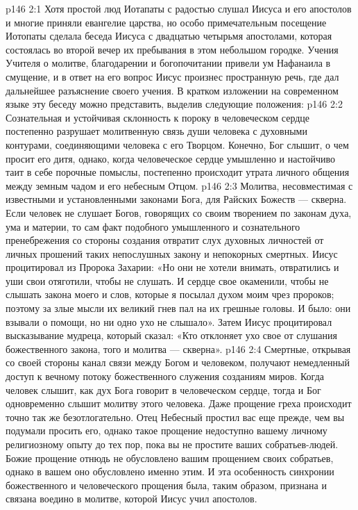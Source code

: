 \vs p146 2:1 Хотя простой люд Иотапаты с радостью слушал Иисуса и его апостолов и многие приняли евангелие царства, но особо примечательным посещение Иотопаты сделала беседа Иисуса с двадцатью четырьмя апостолами, которая состоялась во второй вечер их пребывания в этом небольшом городке. Учения Учителя о молитве, благодарении и богопочитании привели ум Нафанаила в смущение, и в ответ на его вопрос Иисус произнес пространную речь, где дал дальнейшее разъяснение своего учения. В кратком изложении на современном языке эту беседу можно представить, выделив следующие положения:
\vs p146 2:2 \pc {}\bibnobreakspace Сознательная и устойчивая склонность к пороку в человеческом сердце постепенно разрушает молитвенную связь души человека с духовными контурами, соединяющими человека с его Творцом. Конечно, Бог слышит, о чем просит его дитя, однако, когда человеческое сердце умышленно и настойчиво таит в себе порочные помыслы, постепенно происходит утрата личного общения между земным чадом и его небесным Отцом.
\vs p146 2:3 \pc {}\bibnobreakspace Молитва, несовместимая с известными и установленными законами Бога, для Райских Божеств --- скверна. Если человек не слушает Богов, говорящих со своим творением по законам духа, ума и материи, то сам факт подобного умышленного и сознательного пренебрежения со стороны создания отвратит слух духовных личностей от личных прошений таких непослушных закону и непокорных смертных. Иисус процитировал из Пророка Захарии: «Но они не хотели внимать, отвратились и уши свои отяготили, чтобы не слушать. И сердце свое окаменили, чтобы не слышать закона моего и слов, которые я посылал духом моим чрез пророков; поэтому за злые мысли их великий гнев пал на их грешные головы. И было: они взывали о помощи, но ни одно ухо не слышало». Затем Иисус процитировал высказывание мудреца, который сказал: «Кто отклоняет ухо свое от слушания божественного закона, того и молитва --- скверна».
\vs p146 2:4 \pc {}\bibnobreakspace Смертные, открывая со своей стороны канал связи между Богом и человеком, получают немедленный доступ к вечному потоку божественного служения созданиям миров. Когда человек слышит, как дух Бога говорит в человеческом сердце, тогда и Бог одновременно слышит молитву этого человека. Даже прощение греха происходит точно так же безотлогательно. Отец Небесный простил вас еще прежде, чем вы подумали просить его, однако такое прощение недоступно вашему личному религиозному опыту до тех пор, пока вы не простите ваших собратьев\hyp{}людей.  Божие прощение отнюдь не обусловлено вашим прощением своих собратьев, однако в вашем  оно обусловлено именно этим. И эта особенность синхронии божественного и человеческого прощения была, таким образом, признана и связана воедино в молитве, которой Иисус учил апостолов.
